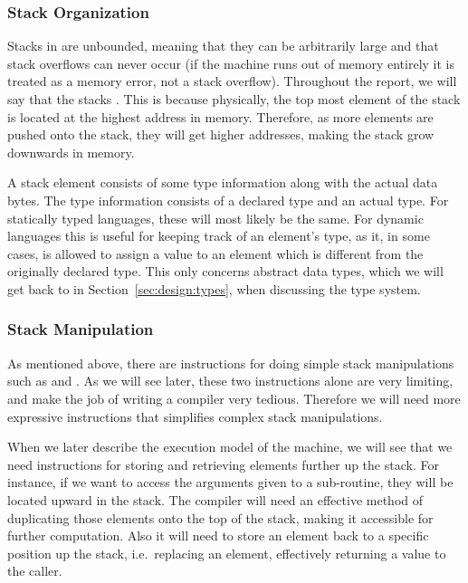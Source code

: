 \subsubsection{Stack Organization}

Stacks in \thename{} are unbounded, meaning that they can be arbitrarily large
and that stack overflows can never occur (if the machine runs out of memory
entirely it is treated as a memory error, not a stack overflow). Throughout the
report, we will say that the stacks . This is because
physically, the top most element of the stack is located at the highest address
in memory. Therefore, as more elements are pushed onto the stack, they will get
higher addresses, making the stack grow downwards in memory.

A stack element consists of some type information along with the actual data
bytes. The type information consists of a declared type and an actual type. For
statically typed languages, these will most likely be the same. For dynamic
languages this is useful for keeping track of an element's type, as it, in some
cases, is allowed to assign a value to an element which is different from the
originally declared type. This only concerns abstract data types, which we will
get back to in Section~\ref{sec:design:types}, when discussing the type system.

\subsubsection{Stack Manipulation}

As mentioned above, there are instructions for doing simple stack manipulations
such as  and . As we will see later, these two instructions
alone are very limiting, and make the job of writing a compiler very
tedious. Therefore we will need more expressive instructions that simplifies
complex stack manipulations.

When we later describe the execution model of the machine, we will see that we
need instructions for storing and retrieving elements further up the stack. For
instance, if we want to access the arguments given to a sub-routine, they will
be located upward in the stack. The compiler will need an effective method of
duplicating those elements onto the top of the stack, making it accessible for
further computation. Also it will need to store an element back to a specific
position up the stack, i.e.~replacing an element, effectively returning a value
to the caller.

